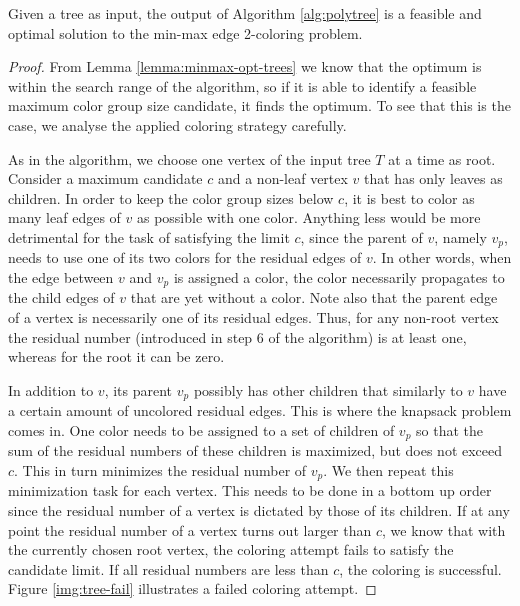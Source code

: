 \documentclass[runningheads, a4paper]{llncs}
\begin{document}
\begin{theorem}
Given a tree as input, the output of Algorithm \ref{alg:polytree} is a feasible and optimal solution to the min-max edge 2-coloring problem.
\end{theorem}
\begin{proof}
From Lemma \ref{lemma:minmax-opt-trees} we know that the optimum is within the search range of the algorithm, so if it is able to identify a feasible maximum color group size candidate, it finds the optimum. To see that this is the case, we analyse the applied coloring strategy carefully.

As in the algorithm, we choose one vertex of the input tree $T$ at a time as root. Consider a maximum candidate $c$ and a non-leaf vertex $v$ that has only leaves as children. In order to keep the color group sizes below $c$, it is best to color as many leaf edges of $v$ as possible with one color. Anything less would be more detrimental for the task of satisfying the limit $c$, since the parent of $v$, namely $v_p$, needs to use one of its two colors for the residual edges of $v$. In other words, when the edge between $v$ and $v_p$ is assigned a color, the color necessarily propagates to the child edges of $v$ that are yet without a color. Note also that the parent edge of a vertex is necessarily one of its residual edges. Thus, for any non-root vertex the residual number (introduced in step 6 of the algorithm) is at least one, whereas for the root it can be zero.

In addition to $v$, its parent $v_p$ possibly has other children that similarly to $v$ have a certain amount of uncolored residual edges. This is where the knapsack problem comes in. One color needs to be assigned to a set of children of $v_p$ so that the sum of the residual numbers of these children is maximized, but does not exceed $c$. This in turn minimizes the residual number of $v_p$. We then repeat this minimization task for each vertex. This needs to be done in a bottom up order since the residual number of a vertex is dictated by those of its children. If at any point the residual number of a vertex turns out larger than $c$, we know that with the currently chosen root vertex, the coloring attempt fails to satisfy the candidate limit. If all residual numbers are less than $c$, the coloring is successful. Figure \ref{img:tree-fail} illustrates a failed coloring attempt.




\end{proof}
\end{document}
